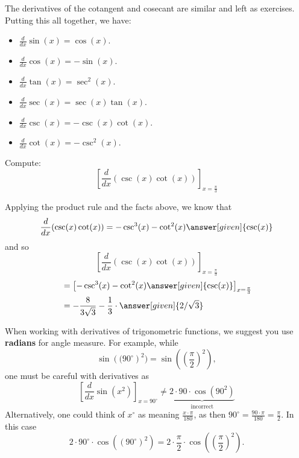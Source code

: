 \documentclass{ximera}
\begin{document}
The derivatives of the cotangent and cosecant are similar and left as
exercises.  Putting this all together, we have:

\begin{theorem} \hfil
\begin{itemize}
\item $\frac{d}{dx} \sin(x) = \cos(x)$.
\item $\frac{d}{dx} \cos(x) = -\sin(x)$.
\item $\frac{d}{dx} \tan(x) = \sec^2(x)$.
\item $\frac{d}{dx} \sec(x) = \sec(x)\tan(x)$.
\item $\frac{d}{dx} \csc(x) = -\csc(x)\cot(x)$.
\item $\frac{d}{dx} \cot(x) = -\csc^2(x)$.
\end{itemize}
\end{theorem}

\begin{example}
Compute:
\[
\left[\frac{d}{dx} ( \csc(x) \cot(x) )\right]_{x=\frac{\pi}{3}}
\]
\begin{explanation}
Applying the product rule and the facts above, we know that
\[
\frac{d}{dx} ( \csc(x) \cot(x) ) = - \csc^3(x) - \cot^2(x)\answer[given]{\csc(x)}
\]
and so
\[
\left[\frac{d}{dx} ( \csc(x) \cot(x) )\right]_{x=\frac{\pi}{3}}
\]
\begin{align*}
  &=  \left[ - \csc^3(x) - \cot^2(x) \answer[given]{\csc(x)}\right]_{x=\frac{\pi}{3}}  \\
&= - \frac{8}{3 \sqrt{3}} - \frac{1}{3}\cdot \answer[given]{2/\sqrt{3}}
\end{align*}
\end{explanation}
\end{example}


\begin{warning}
When working with derivatives of trigonometric functions, we suggest
you use \textbf{radians} for angle measure. For example, while
\[
\sin\left((90^\circ\right)^2) = \sin\left(\left(\frac{\pi}{2}\right)^2\right),
\]
one must be careful with derivatives as
\[
\left[\frac{d}{dx} \sin\left(x^2\right)\right]_{x=90^\circ} \ne \underbrace{2\cdot 90\cdot \cos(90^2)}_{\text{incorrect}}
\]
Alternatively, one could think of $x^\circ$ as meaning
$\frac{x\cdot\pi}{180}$, as then $90^\circ = \frac{90\cdot\pi}{180} =
\frac{\pi}{2}$. In this case
\[
2\cdot 90^\circ\cdot \cos((90^\circ)^2) = 2\cdot \frac{\pi}{2}\cdot\cos\left(\left(\frac{\pi}{2}\right)^2\right).
\]
\end{warning}
\end{document}
